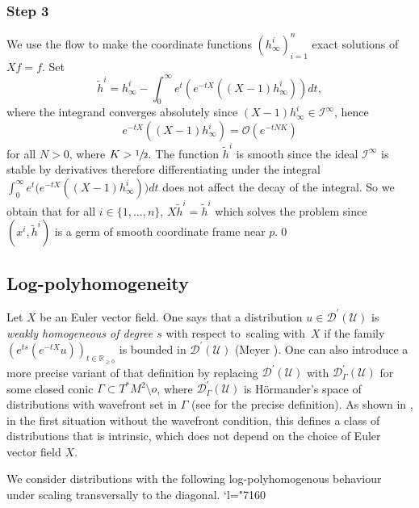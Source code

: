 \documentclass[JEP,XML,SOM,Unicode]{cedram}
\let\pazocal\mathscr
\newcommand{\Changel}{\mathcode`l="7160}
\theoremstyle{definition}
\let\euler X
\newcommand\zero{{\textit{o}}}
\newcommand{\step}[1]{\subsubsection*{Step #1}}
\begin{document}
\step{3} We use the flow to make the coordinate functions $(h_\infty^i)_{i=1}^n$ exact solutions of
$\euler f=f$.
Set
\[
\tilde{h}^i=h^i_\infty-\int_0^\infty e^{t} \left(e^{-t\euler}\left((\euler-1)h^i_\infty \right)\right) dt,
\]
where the integrand converges absolutely since $(\euler-1)h^i_\infty\in \pazocal{I}^\infty $, hence
\[
e^{-t\euler}\left((\euler-1)h^i_\infty \right)=\pazocal{O}(e^{-tNK})
\]
for all $N>0$, where $K>\sfrac{1}{2}$. The function $\tilde{h}^i$ is smooth since
the ideal $\pazocal{I}^\infty$ is stable by derivatives therefore
differentiating under the integral $\int_0^\infty e^{t} \bigl(e^{-t\euler}((\euler-1)h^i_\infty)\bigr) dt$
does not affect the decay of the integral.
So we obtain that for all $i\in \{1,\dots,n\}$, $\euler \tilde{h}^i=\tilde{h}^i$ which
solves the problem since $(x^i,\tilde{h}^i)$ is a germ of smooth coordinate frame near $p$.\qed

\subsection{Log-polyhomogeneity}

Let $\euler$ be an Euler vector field.
One says that a distribution $u\in \pazocal{D}^\prime(\pazocal{U})$
is \emph{weakly
homogeneous of degree $s$} with respect to~scaling with~$\euler$ if the family $(e^{ts} (e^{-t\euler}u))_{t\in \mathbb{R}_{\geqslant 0}}$
is bounded in $\pazocal{D}^\prime(\pazocal{U})$ (\cf Meyer \cite{Meyer}). One can also introduce a more precise variant of that definition by replacing $\pazocal{D}^\prime(\pazocal{U})$ with $\pazocal{D}^\prime_\Gamma(\pazocal{U})$ for some closed conic $\Gamma\subset T^*M^2\setminus\zero$, where $\pazocal{D}^\prime_\Gamma(\pazocal{U})$ is Hörmander's space of distributions with wavefront set in $\Gamma$ (see \cite[\S8.2]{H} for the precise definition). As shown in \cite[Th.\,1.4]{DangAHP}, {in the first situation without the wavefront condition, this defines} a class of distributions that is intrinsic, \ie which does not depend on the choice of Euler vector field $\euler$.

We consider distributions with the following log-polyhomogenous behaviour under scaling transversally to the diagonal.
\Changel
\end{document}
